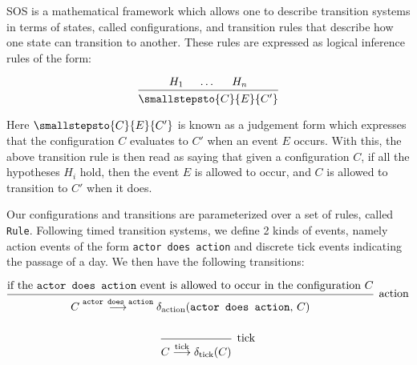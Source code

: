 \documentclass{article}
\begin{document}
SOS is a mathematical framework which allows one to describe
transition systems in terms of states, called configurations, and transition
rules that describe how one state can transition to another.
These rules are expressed as logical inference rules of the form:

\begin{align*}
  \begin{prooftree}
    \hypo{H_1}
    \hypo{\dots}
    \hypo{H_n}
    \infer3{\smallstepsto{C}{E}{C'}}
  \end{prooftree}
\end{align*}

Here $\smallstepsto{C}{E}{C'}$ is known as a judgement form which expresses that
the configuration $C$ evaluates to $C'$ when an event $E$ occurs.
With this, the above transition rule is then read as saying that given a
configuration $C$, if all the hypotheses $H_i$ hold, then the event $E$ is
allowed to occur, and $C$ is allowed to transition to $C'$ when it does.



Our configurations and transitions are parameterized over
a set of rules, called \texttt{Rule}.
Following timed transition systems, we define 2 kinds of events, namely action
events of the form \texttt{actor does action} and discrete tick events
indicating the passage of a day.
We then have the following transitions:

\begin{gather*}
  \begin{prooftree}
    \hypo{\text{if the \texttt{actor does action} event is allowed to occur in the configuration } C}
    \infer1[\text{action}]{C \overset{\texttt{actor does action}}{\longrightarrow} \delta_\text{action}(\texttt{actor does action}, \, C)}
  \end{prooftree}
  \\ \\
  \begin{prooftree}
    \infer0[\text{tick}]{C \overset{\text{tick}}{\longrightarrow} \delta_\text{tick}(C)}
  \end{prooftree}
\end{gather*}
\end{document}

